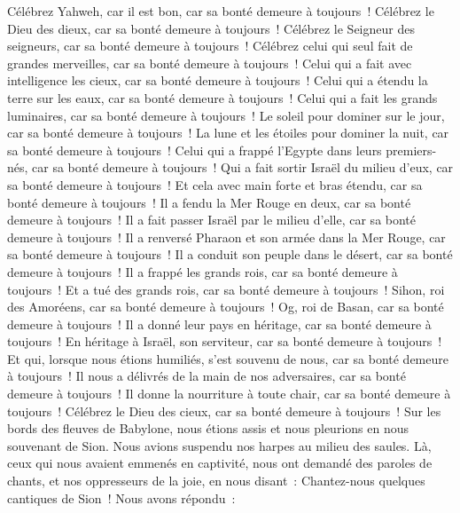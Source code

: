 \begin{multicols}{2}
\VerseOne{}Célébrez Yahweh, car il est bon, car sa bonté demeure à toujours~!
Célébrez le Dieu des dieux, car sa bonté demeure à toujours~!
Célébrez le Seigneur des seigneurs, car sa bonté demeure à toujours~!
Célébrez celui qui seul fait de grandes merveilles, car sa bonté demeure à toujours~!
Celui qui a fait avec intelligence les cieux, car sa bonté demeure à toujours~!
Celui qui a étendu la terre sur les eaux, car sa bonté demeure à toujours~!
Celui qui a fait les grands luminaires, car sa bonté demeure à toujours~!
Le soleil pour dominer sur le jour, car sa bonté demeure à toujours~!
La lune et les étoiles pour dominer la nuit, car sa bonté demeure à toujours~!
Celui qui a frappé l'Egypte dans leurs premiers-nés, car sa bonté demeure à toujours~!
Qui a fait sortir Israël du milieu d'eux, car sa bonté demeure à toujours~!
Et cela avec main forte et bras étendu, car sa bonté demeure à toujours~!
Il a fendu la Mer Rouge en deux, car sa bonté demeure à toujours~!
Il a fait passer Israël par le milieu d'elle, car sa bonté demeure à toujours~!
Il a renversé Pharaon et son armée dans la Mer Rouge, car sa bonté demeure à toujours~!
Il a conduit son peuple dans le désert, car sa bonté demeure à toujours~!
Il a frappé les grands rois, car sa bonté demeure à toujours~!
Et a tué des grands rois, car sa bonté demeure à toujours~!
Sihon, roi des Amoréens, car sa bonté demeure à toujours~!
Og, roi de Basan, car sa bonté demeure à toujours~!
Il a donné leur pays en héritage, car sa bonté demeure à toujours~!
En héritage à Israël, son serviteur, car sa bonté demeure à toujours~!
Et qui, lorsque nous étions humiliés, s'est souvenu de nous, car sa bonté demeure à toujours~!
Il nous a délivrés de la main de nos adversaires, car sa bonté demeure à toujours~!
Il donne la nourriture à toute chair, car sa bonté demeure à toujours~!
Célébrez le Dieu des cieux, car sa bonté demeure à toujours~!
\VerseOne{}Sur les bords des fleuves de Babylone, nous étions assis et nous pleurions en nous souvenant de Sion.
Nous avions suspendu nos harpes au milieu des saules.
Là, ceux qui nous avaient emmenés en captivité, nous ont demandé des paroles de chants, et nos oppresseurs de la joie, en nous disant~: Chantez-nous quelques cantiques de Sion~! Nous avons répondu~:

\end{multicols}
